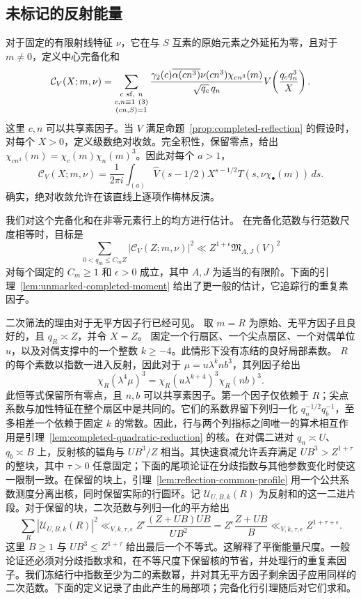 \documentclass[11pt,a4paper]{article}
\numberwithin{equation}{section}
\numberwithin{figure}{section}
\theoremstyle{definition}
\theoremstyle{remark}
\begin{document}
\subsection{未标记的反射能量}

对于固定的有限射线特征 $\nu$，它在与 $S$ 互素的原始元素之外延拓为零，且对于 $m\ne0$，定义中心完备化和
\begin{equation}\label{eq:unmarked-central-completion}
 \mathcal C_V(X;m,\nu)=
 \sum_{\substack{c\ {\rm sf},\ n\\c,n\equiv1\ (3)\\(cn,S)=1}}
 \frac{\gamma_2(c)\overline{\alpha(cn^3)}\nu(cn^3)\chi_{cn^3}(m)}
      {\sqrt{q_c}\,q_n}
 V\!\left(\frac{q_cq_n^3}{X}\right).
\end{equation}
这里 $c,n$ 可以共享素因子。当 $V$ 满足命题~\ref{prop:completed-reflection} 的假设时，对每个 $X>0$，定义级数绝对收敛。完全积性，保留零点，给出
$\chi_{cn^3}(m)=\chi_c(m)\chi_n(m)^3$。因此对每个 $a>1$，
\begin{equation}\label{eq:unmarked-central-mellin}
 \mathcal C_V(X;m,\nu)=\frac1{2\pi i}\int_{(a)}
 \widehat V(s-1/2)X^{s-1/2}T(s,\nu\chi_\bullet(m))\,ds.
\end{equation}
确实，绝对收敛允许在该直线上逐项作梅林反演。


我们对这个完备化和在非零元素行上的均方进行估计。
在完备化范数与行范数尺度相等时，目标是
\[
 \sum_{0<q_m\le C_mZ}|\mathcal C_V(Z;m,\nu)|^2
 \ll Z^{1+\epsilon}\mathfrak M_{A,J}(V)^2
\]
对每个固定的 $C_m\ge1$ 和 $\epsilon>0$ 成立，其中 $A,J$ 为适当的有限阶。下面的引理~\ref{lem:unmarked-completed-moment} 给出了更一般的估计，它追踪行的重复素因子。

二次筛法的理由对于无平方因子行已经可见。
取 $m=R$ 为原始、无平方因子且良好的，且 $q_R\asymp Z$，并令 $X=Z$。
固定一个行扇区、一个尖点扇区、一个对偶单位 $u$，以及对偶支撑中的一个整数 $k\ge-4$。此情形下没有冻结的良好局部素数。
$R$ 的每个素数以指数一进入反射，因此对于
$\mu=u\lambda^k n b^3$，其列因子给出
\[
 \chi_R(\lambda^4\mu)^3
 =\chi_R(u\lambda^{k+4})^3\chi_R(nb)^3.
\]
此恒等式保留所有零点，且 $n,b$ 可以共享素因子。第一个因子仅依赖于 $R$；尖点系数与加性特征在整个扇区中是共同的。它们的系数界留下列归一化 $q_n^{-1/2}q_b^{-1}$，至多相差一个依赖于固定 $k$ 的常数。因此，行与两个列指标之间唯一的算术相互作用是引理~\ref{lem:completed-quadratic-reduction} 的核。在对偶二进对 $q_n\asymp U$、$q_b\asymp B$ 上，反射核的辐角与 $UB^3/Z$ 相当。其快速衰减允许丢弃满足 $UB^3>Z^{1+\tau}$ 的整块，其中 $\tau>0$ 任意固定；下面的尾项论证在分歧指数与其他参数变化时使这一限制一致。在保留的块上，引理~\ref{lem:reflection-common-profile} 用一个公共系数测度分离出核，同时保留实际的行圆环。记 $\mathcal U_{U,B,k}(R)$ 为反射和的这一二进片段。对于保留的块，二次范数与列归一化的平方给出
\[
 \sum_R|\mathcal U_{U,B,k}(R)|^2
 \ll_{V,k,\tau,\epsilon}Z^\epsilon
       \frac{(Z+UB)UB}{UB^2}
 =Z^\epsilon\frac{Z+UB}{B}
 \ll_{V,k,\tau,\epsilon}Z^{1+\tau+\epsilon}.
\]
这里 $B\ge1$ 与 $UB^3\le Z^{1+\tau}$ 给出最后一个不等式。这解释了平衡能量尺度。一般论证还必须对分歧指数求和，在不等尺度下保留核的节省，并处理行的重复素因子。我们冻结行中指数至少为二的素数幂，并对其无平方因子剩余因子应用同样的二次范数。下面的定义记录了由此产生的局部项；完备化行引理随后对它们求和。
\end{document}
